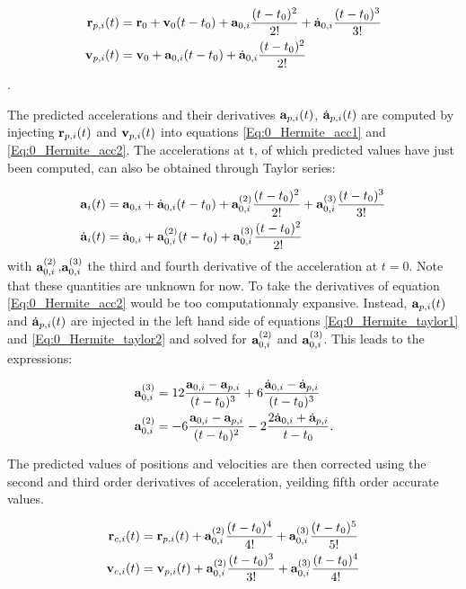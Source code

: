 \begin{align}
\bold{r}_{p,i}(t) &= \bold{r}_0 + \bold{v}_0 (t-t_0) + \bold{a}_{0,i}\frac{(t-t_0)^2}{2!} 	
		 +\dot{\bold{a}}_{0,i}\frac{(t-t_0)^3}{3!}\\
\bold{v}_{p,i}(t) &= \bold{v}_0 + \bold{a}_{0,i}(t-t_0) + \dot{\bold{a}}_{0,i}\frac{(t-t_0)^2}{2!}
\end{align}.

The predicted accelerations and their derivatives $\bold{a}_{p,i}(t)$,  $\dot{\bold{a}}_{p,i}(t)$ are computed by injecting $\bold{r}_{p,i}(t)$ and $\bold{v}_{p,i}(t)$ into equations \ref{Eq:0_Hermite_acc1} and \ref{Eq:0_Hermite_acc2}. The accelerations at t, of which predicted values have just been computed, can also be obtained through Taylor series:

\begin{align}
\label{Eq:0_Hermite_taylor1}
\bold{a}_{i}(t) &= \bold{a}_{0,i} + \dot{\bold{a}}_{0,i} (t-t_0) + \bold{a}^{(2)}_{0,i}\frac{(t-t_0)^2}{2!} + \bold{a}^{(3)}_{0,i}\frac{(t-t_0)^3}{3!}\\
\label{Eq:0_Hermite_taylor2}
\dot{\bold{a}}_{i}(t) &=  \dot{\bold{a}}_{0,i} +  \bold{a}^{(2)}_{0,i}(t-t_0) + \bold{a}^{(3)}_{0,i}\frac{(t-t_0)^2}{2!}
\end{align}
with $\bold{a}^{(2)}_{0,i}$,$\bold{a}^{(3)}_{0,i}$ the third and fourth derivative of the acceleration at $t=0$. Note that these quantities are unknown for now. To take the derivatives of equation \ref{Eq:0_Hermite_acc2} would be too computationnaly expansive. Instead, $\bold{a}_{p,i}(t)$ and  $\dot{\bold{a}}_{p,i}(t)$ are injected in the left hand side of equations \ref{Eq:0_Hermite_taylor1} and \ref{Eq:0_Hermite_taylor2} and solved for $\bold{a}^{(2)}_{0,i}$ and $\bold{a}^{(3)}_{0,i}$. This leads to the expressions:

\begin{align}
\bold{a}^{(3)}_{0,i} &= 12 \frac{\bold{a}_{0,i} - \bold{a}_{p,i}}{(t-t_0)^3} +6 \frac{\dot{\bold{a}}_{0,i} - \dot{\bold{a}}_{p,i}}{(t-t_0)^3}\\
\bold{a}^{(2)}_{0,i} &= -6 \frac{\bold{a}_{0,i} - \bold{a}_{p,i}}{(t-t_0)^2} - 2 \frac{2\dot{\bold{a}}_{0,i} + \dot{\bold{a}}_{p,i}}{t-t_0}.
\end{align}

The predicted values of positions and velocities are then corrected using the second and third order derivatives of acceleration, yeilding fifth order accurate values.

\begin{align}
\bold{r}_{c,i}(t) &= \bold{r}_{p,i}(t) + \bold{a}^{(2)}_{0,i} \frac{(t-t_0)^4}{4!} +
	 \bold{a}^{(3)}_{0,i} \frac{(t-t_0)^5}{5!}\\
\bold{v}_{c,i}(t) &= \bold{v}_{p,i}(t) + \bold{a}^{(2)}_{0,i} \frac{(t-t_0)^3}{3!} +
	 \bold{a}^{(3)}_{0,i} \frac{(t-t_0)^4}{4!}\\
\end{align}



